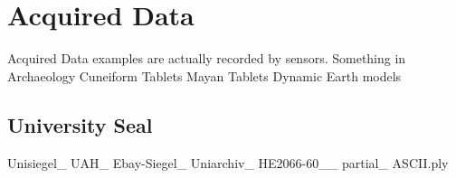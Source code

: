 \section{Acquired Data}
Acquired Data examples are actually recorded by sensors.
Something in Archaeology
Cuneiform Tablets
Mayan Tablets
Dynamic Earth models

\subsection{University Seal}
Unisiegel\_\- UAH\_\- Ebay-Siegel\_\- Uniarchiv\_\- HE2066-60\_\_\- partial\_\- ASCII.ply
%
%
